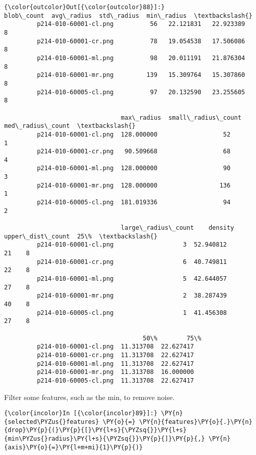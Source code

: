             \begin{Verbatim}[commandchars=\\\{\}]
{\color{outcolor}Out[{\color{outcolor}88}]:}                        blob\_count  avg\_radius  std\_radius  min\_radius  \textbackslash{}
         p214-010-60001-cl.png          56   22.121831   22.923389           8
         p214-010-60001-cr.png          78   19.054538   17.506086           8
         p214-010-60001-ml.png          98   20.011191   21.876304           8
         p214-010-60001-mr.png         139   15.309764   15.307860           8
         p214-010-60005-cl.png          97   20.132590   23.255605           8

                                max\_radius  small\_radius\_count  med\_radius\_count  \textbackslash{}
         p214-010-60001-cl.png  128.000000                  52                 1
         p214-010-60001-cr.png   90.509668                  68                 4
         p214-010-60001-ml.png  128.000000                  90                 3
         p214-010-60001-mr.png  128.000000                 136                 1
         p214-010-60005-cl.png  181.019336                  94                 2

                                large\_radius\_count    density  upper\_dist\_count  25\%  \textbackslash{}
         p214-010-60001-cl.png                   3  52.940812                21    8
         p214-010-60001-cr.png                   6  40.749811                22    8
         p214-010-60001-ml.png                   5  42.644057                27    8
         p214-010-60001-mr.png                   2  38.287439                40    8
         p214-010-60005-cl.png                   1  41.456308                27    8

                                      50\%        75\%
         p214-010-60001-cl.png  11.313708  22.627417
         p214-010-60001-cr.png  11.313708  22.627417
         p214-010-60001-ml.png  11.313708  22.627417
         p214-010-60001-mr.png  11.313708  16.000000
         p214-010-60005-cl.png  11.313708  22.627417
\end{Verbatim}

    Filter some features, such as the min, to remove noise.

    \begin{Verbatim}[commandchars=\\\{\}]
{\color{incolor}In [{\color{incolor}89}]:} \PY{n}{selected\PYZus{}features} \PY{o}{=} \PY{n}{features}\PY{o}{.}\PY{n}{drop}\PY{p}{(}\PY{p}{[}\PY{l+s}{\PYZsq{}}\PY{l+s}{min\PYZus{}radius}\PY{l+s}{\PYZsq{}}\PY{p}{]}\PY{p}{,} \PY{n}{axis}\PY{o}{=}\PY{l+m+mi}{1}\PY{p}{)}
\end{Verbatim}


